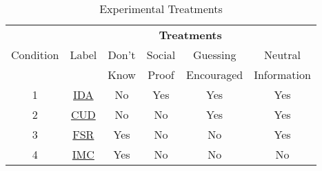 \begin{table}[H]
\centering
\caption{Experimental Treatments}
\label{tab:conditions}
\begin{tabular}{cccccc}
\hline
           & \multicolumn{5}{c}{\textbf{Treatments}}              \\
 Condition & Label & Don't & Social & Guessing   & Neutral      \\
           &       & Know  & Proof  & Encouraged & Information  \\ \hline
 1         & \hyperref[txt:IDA]{IDA} & No    & Yes    & Yes        &  Yes \\
 2         & \hyperref[txt:CUD]{CUD} & No    & No     & Yes        &  Yes \\
 3         & \hyperref[txt:FSR]{FSR} & Yes   & No     & No         &  Yes \\
 4         & \hyperref[txt:IMC]{IMC} & Yes   & No     & No         &  No  \\
  \hline
\end{tabular}
\end{table}
{}